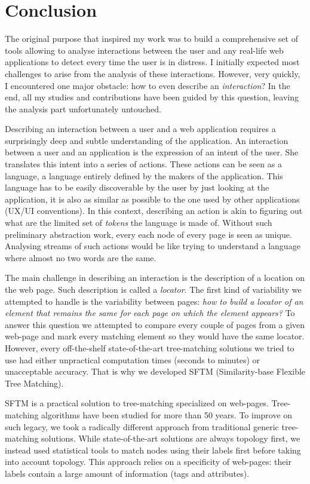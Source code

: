 \chapter{Conclusion}
\label{ch:conclusion}

The original purpose that inspired my work was to build a comprehensive set of tools allowing to analyse interactions between the user and any real-life web applications to detect every time the user is in distress. 
I initially expected most challenges to arise from the analysis of these interactions. 
However, very quickly, I encountered one major obstacle: how to even describe an \textit{interaction}?
In the end, all my studies and contributions have been guided by this question, leaving the analysis part unfortunately untouched.

Describing an interaction between a user and a web application requires a surprisingly deep and subtle understanding of the application. 
An interaction between a user and an application is the expression of an intent of the user.
She translates this intent into a series of actions. These actions can be seen as a language,
a language entirely defined by the makers of the application.
This language has to be easily discoverable by the user by just looking at the application, it is also as similar as possible to the one used by other applications (UX/UI conventions). 
In this context, describing an action is akin to figuring out what are the limited set of \textit{tokens} the language is made of.
Without such preliminary abstraction work, every each node of every page is seen as unique. 
Analysing streams of such actions would be like trying to understand a language where almost no two words are the same.

The main challenge in describing an interaction is the description of a location on the web page.
Such description is called a \textit{locator}. The first kind of variability we attempted to handle is the variability between pages: \textit{how to build a locator of an element that remains the same for each page on which the element appears?}
To answer this question we attempted to compare every couple of pages from a given web-page and mark every matching element so they would have the same locator. 
However, every off-the-shelf state-of-the-art tree-matching solutions we tried to use had either unpractical computation times (seconds to minutes) or unacceptable accuracy.
That is why we developed SFTM (Similarity-base Flexible Tree Matching).

SFTM is a practical solution to tree-matching specialized on web-pages.
Tree-matching algorithms have been studied for more than 50 years.
To improve on such legacy, we took a radically different approach from traditional generic tree-matching solutions.
While state-of-the-art solutions are always topology first, we instead used statistical tools to match nodes using their labels first before taking into account topology.
This approach relies on a specificity of web-pages: their labels contain a large amount of information (tags and attributes).

